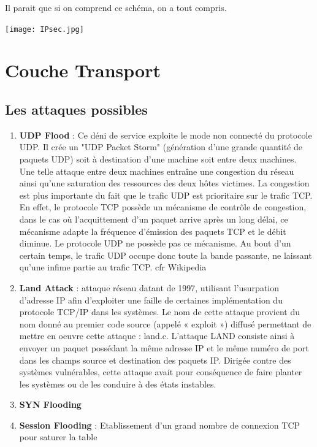 \documentclass{report}
\begin{document}
Il parait que si on comprend ce schéma, on a tout compris.

\texttt{[image: IPsec.jpg]}


\section{Couche Transport}

\subsection{Les attaques possibles}

\begin{enumerate}
    \item \textbf{UDP Flood} : Ce déni de service exploite le mode non connecté du protocole UDP. Il crée un "UDP Packet Storm" (génération d’une grande quantité de paquets UDP) soit à destination d’une machine soit entre deux machines. Une telle attaque entre deux machines entraîne une congestion du réseau ainsi qu’une saturation des ressources des deux hôtes victimes. La congestion est plus importante du fait que le trafic UDP est prioritaire sur le trafic TCP. En effet, le protocole TCP possède un mécanisme de contrôle de congestion, dans le cas où l’acquittement d’un paquet arrive après un long délai, ce mécanisme adapte la fréquence d’émission des paquets TCP et le débit diminue. Le protocole UDP ne possède pas ce mécanisme. Au bout d’un certain temps, le trafic UDP occupe donc toute la bande passante, ne laissant qu’une infime partie au trafic TCP. cfr Wikipedia

    \item \textbf{Land Attack} : attaque réseau datant de 1997, utilisant l'usurpation d'adresse IP afin d'exploiter une faille de certaines implémentation du protocole TCP/IP dans les systèmes. Le nom de cette attaque provient du nom donné au premier code source (appelé « exploit ») diffusé permettant de mettre en oeuvre cette attaque : land.c. L'attaque LAND consiste ainsi à envoyer un paquet possédant la même adresse IP et le même numéro de port dans les champs source et destination des paquets IP. Dirigée contre des systèmes vulnérables, cette attaque avait pour conséquence de faire planter les systèmes ou de les conduire à des états instables.

    \item \textbf{SYN Flooding}
    \item \textbf{Session Flooding} : Etablissement d'un grand nombre de connexion TCP pour saturer la table


\end{enumerate}
\end{document}
